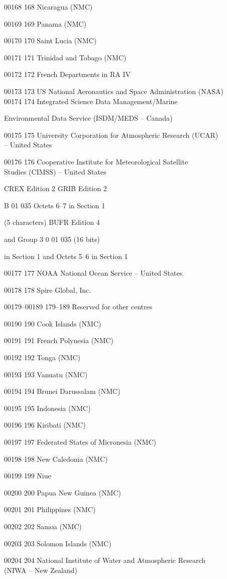 00168 168 Nicaragua (NMC)

00169 169 Panama (NMC)

00170 170 Saint Lucia (NMC)

00171 171 Trinidad and Tobago (NMC)

00172 172 French Departments in RA IV

00173 173 US National Aeronautics and Space Administration (NASA)\\
00174 174 Integrated Science Data Management/Marine

Environmental Data Service (ISDM/MEDS -- Canada)

00175 175 University Corporation for Atmospheric Research (UCAR)\\
-- United States

00176 176 Cooperative Institute for Meteorological Satellite\\
Studies (CIMSS) -- United States

CREX Edition 2 GRIB Edition 2

B 01 035 Octets 6--7 in Section 1

(5 characters) BUFR Edition 4

and Group 3 0 01 035 (16 bits)

in Section 1 and Octets 5--6 in Section 1

00177 177 NOAA National Ocean Service -- United States

00178 178 Spire Global, Inc.

00179--00189 179--189 Reserved for other centres

00190 190 Cook Islands (NMC)

00191 191 French Polynesia (NMC)

00192 192 Tonga (NMC)

00193 193 Vanuatu (NMC)

00194 194 Brunei Darussalam (NMC)

00195 195 Indonesia (NMC)

00196 196 Kiribati (NMC)

00197 197 Federated States of Micronesia (NMC)

00198 198 New Caledonia (NMC)

00199 199 Niue

00200 200 Papua New Guinea (NMC)

00201 201 Philippines (NMC)

00202 202 Samoa (NMC)

00203 203 Solomon Islands (NMC)

00204 204 National Institute of Water and Atmospheric Research\\
(NIWA -- New Zealand)

